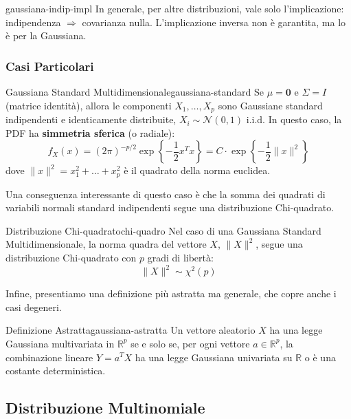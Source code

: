 \begin{nota}{}{gaussiana-indip-impl}
In generale, per altre distribuzioni, vale solo l'implicazione: indipendenza
$\Rightarrow$ covarianza nulla. L'implicazione inversa non è garantita, ma lo
è per la Gaussiana.
\end{nota}

\subsubsection*{Casi Particolari}

\begin{proposizione}{Gaussiana Standard Multidimensionale}{gaussiana-standard}
Se $\mu = \mathbf{0}$ e $\Sigma = I$ (matrice identità), allora le componenti
$X_1, \dots, X_p$ sono Gaussiane standard indipendenti e identicamente
distribuite, $X_i \sim \mathcal{N}(0,1)$ i.i.d.
In questo caso, la PDF ha \textbf{simmetria sferica} (o radiale):
$$
f_X(x) = (2\pi)^{-p/2} \exp\left\{-\frac{1}{2}x^T x\right\} = C \cdot
\exp\left\{-\frac{1}{2}\|x\|^2\right\}
$$
dove $\|x\|^2 = x_1^2 + \dots + x_p^2$ è il quadrato della norma euclidea.
\end{proposizione}

Una conseguenza interessante di questo caso è che la somma dei quadrati di
variabili normali standard indipendenti segue una distribuzione Chi-quadrato.

\begin{nota}{Distribuzione Chi-quadrato}{chi-quadro}
Nel caso di una Gaussiana Standard Multidimensionale, la norma quadra del
vettore $X$, $\|X\|^2$, segue una distribuzione Chi-quadrato con $p$ gradi di
libertà:
$$
\|X\|^2 \sim \chi^2(p)
$$
\end{nota}

Infine, presentiamo una definizione più astratta ma generale, che copre anche i
casi degeneri.

\begin{definizione}{Definizione Astratta}{gaussiana-astratta}
Un vettore aleatorio $X$ ha una legge Gaussiana multivariata in $\mathbb{R}^p$
se e solo se, per ogni vettore $a \in \mathbb{R}^p$, la combinazione lineare $Y
= a^T X$ ha una legge Gaussiana univariata su $\mathbb{R}$ o è una costante
deterministica.
\end{definizione}

\subsection{Distribuzione Multinomiale}

